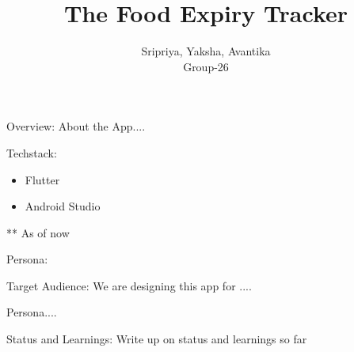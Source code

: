 \documentclass{beamer}
\title[Expiry Express]{The Food Expiry Tracker}
\author{Sripriya, Yaksha, Avantika\\Group-26}
\begin{document}
\begin{frame}
\titlepage
\end{frame}

\begin{frame}{Overview: }
About the App....
\end{frame}

\begin{frame}{Techstack: }
	\begin{itemize}
			\pause
		\item Flutter
			\pause
		\item Android Studio
			\pause
	\end{itemize}
** As of now
\end{frame}

\begin{frame}{Persona: }
	\begin{block}{Target Audience: }
		We are designing this app for ....
	\end{block}
Persona....
\end{frame}

\begin{frame}{Status and Learnings: }
	Write up on status and learnings so far
\end{frame}
\end{document}
